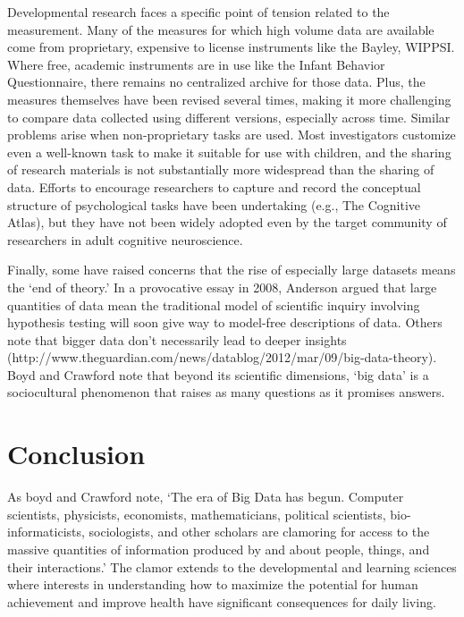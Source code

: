 \documentclass[letterpaper,man,apacite]{apa6}
\begin{document}
Developmental research faces a specific point of tension related to the measurement.
Many of the measures for which high volume data are available come from proprietary, expensive to license instruments like the Bayley, WIPPSI.
Where free, academic instruments are in use like the Infant Behavior Questionnaire, there remains no centralized archive for those data.
Plus, the measures themselves have been revised several times, making it more challenging to compare data collected using different versions, especially across time.
Similar problems arise when non-proprietary tasks are used.
Most investigators customize even a well-known task to make it suitable for use with children, and the sharing of research materials is not substantially more widespread than the sharing of data.
Efforts to encourage researchers to capture and record the conceptual structure of psychological tasks have been undertaking (e.g., The Cognitive Atlas), but they have not been widely adopted even by the target community of researchers in adult cognitive neuroscience.

Finally, some have raised concerns that the rise of especially large datasets means the `end of theory.' \cite{Anderson}
In a provocative essay in 2008, Anderson argued that large quantities of data mean the traditional model of scientific inquiry involving hypothesis testing will soon give way to model-free descriptions of data.
Others note that bigger data don't necessarily lead to deeper insights \cite{Graham} (http://www.theguardian.com/news/datablog/2012/mar/09/big-data-theory).
Boyd and Crawford note \cite{boyd} that beyond its scientific dimensions, `big data' is a sociocultural phenomenon that raises as many questions as it promises answers.

\section{Conclusion}

As boyd and Crawford note, `The era of Big Data has begun. Computer scientists, physicists, economists, mathematicians, political scientists, bio-informaticists, sociologists, and other scholars are clamoring for access to the massive quantities of information produced by and about people, things, and their interactions.' \cite{boyd}
The clamor extends to the developmental and learning sciences where interests in understanding how to maximize the potential for human achievement and improve health have significant consequences for daily living.
\end{document}
